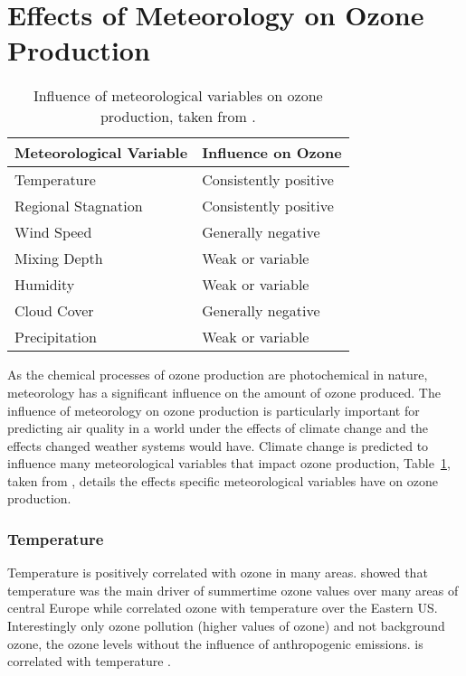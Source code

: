 \section{Effects of Meteorology on Ozone Production} \label{s:meteo_ozone}
\begin{table}
    \centering
    \caption[Influence of meteorological variables on ozone production]{Influence of meteorological variables on ozone production, taken from \citet{Jacob:2009}.}
    \begin{tabular}{ll}
        \hline \hline
        \textbf{Meteorological Variable} & \textbf{Influence on Ozone} \\
        \hline \hline
        Temperature & Consistently positive \\
        Regional Stagnation & Consistently positive \\
        Wind Speed & Generally negative \\
        Mixing Depth & Weak or variable \\
        Humidity & Weak or variable \\
        Cloud Cover & Generally negative \\
        Precipitation & Weak or variable \\
        \hline \hline
    \end{tabular}
    \label{t:meteo_vars}
\end{table}

As the chemical processes of ozone production are photochemical in nature, meteorology has a significant influence on the amount of ozone produced.
The influence of meteorology on ozone production is particularly important for predicting air quality in a world under the effects of climate change and the effects changed weather systems would have.
Climate change is predicted to influence many meteorological variables that impact ozone production, Table~\ref{t:meteo_vars}, taken from \citet{Jacob:2009}, details the effects specific meteorological variables have on ozone production.

\subsubsection{Temperature}
Temperature is positively correlated with ozone in many areas.
\citet{Otero:2016} showed that temperature was the main driver of summertime ozone values over many areas of central Europe while \citet{Camalier:2007} correlated ozone with temperature over the Eastern US.
Interestingly only ozone pollution (higher values of ozone) and not background ozone, the ozone levels without the influence of anthropogenic emissions. is correlated with temperature \citep{Sillman:1995a}.

